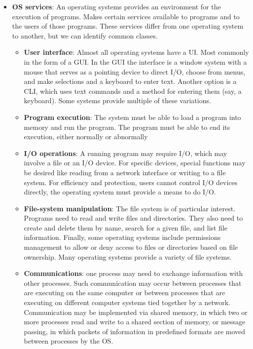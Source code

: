 \documentclass{report}
\begin{document}
\begin{itemize}
        \item \textbf{OS services}: An operating systems provides an environment for the execution of programs. Makes certain services available to programs and to the users of those programs. These services differ from one operating system to another, but we can identify common classes.
            \begin{itemize}
                \item \textbf{User interface}: Almost all operating systems have a UI. Most commonly in the form of a GUI. In the GUI the interface is a window system with a mouse that serves as a pointing device to direct I/O, choose from menus, and make selections and a keyboard to enter text. Another option is a CLI, which uses text commands and a method for entering them (say, a keyboard). Some systems provide multiple of these variations.
                \item \textbf{Program execution}: The system must be able to load a program into memory and run the program. The program must be able to end its execution, either normally or abnormally
                \item \textbf{I/O operations}: A running program may require I/O, which may involve a file or an I/O device. For specific devices, special functions may be desired like reading from a network interface or writing to a file system. For efficiency and protection, users cannot control I/O devices directly, the operating system must provide a means to do I/O.
                \item \textbf{File-system manipulation}: The file system is of particular interest. Programs need to read and write files and directories. They also need to create and delete them by name, search for a given file, and list file information. Finally, some operating systems include permissions management to allow or deny access to files or directories based on file ownership. Many operating systems provide a variety of file systems.
                \item \textbf{Communications}: one process may need to exchange information with other processes. Such communication may occur between processes that are executing on the same computer or between processes that are executing on different computer systems tied together by a network. Communication may be implemented via shared memory, in which two or more processes read and write to a shared section of memory, or message passing, in which packets of information in predefined formats are moved between processes by the OS.

\end{itemize}
\end{itemize}
\end{document}
